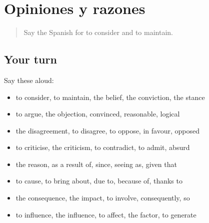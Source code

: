 \section[(dialogue)]{Opiniones y razones}

\label{lesson:ES-R583-repaso-576-583}



\begin{quote}
Say the Spanish for to consider and to maintain.
\end{quote}

\subsection*{Your turn}
Say these aloud:

\begin{itemize}
\raggedright
  \item to consider, to maintain, the belief, the conviction, the stance
  \item to argue, the objection, convinced, reasonable, logical
  \item the disagreement, to disagree, to oppose, in favour, opposed
  \item to criticise, the criticism, to contradict, to admit, absurd
  \item the reason, as a result of, since, seeing as, given that
  \item to cause, to bring about, due to, because of, thanks to
  \item the consequence, the impact, to involve, consequently, so
  \item to influence, the influence, to affect, the factor, to generate
\end{itemize}

